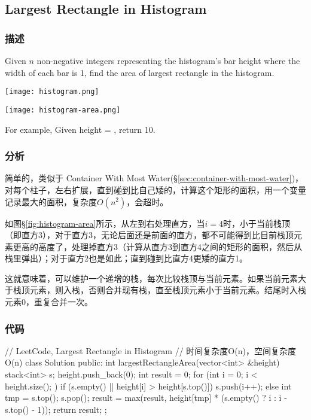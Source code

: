 \subsection{Largest Rectangle in Histogram} %
\label{sec:largest-rectangle-in-histogram}


\subsubsection{描述}
Given $n$ non-negative integers representing the histogram's bar height where the width of each bar is 1, find the area of largest rectangle in the histogram.

\begin{center}
\texttt{[image: histogram.png]}\\
\label{fig:histogram}
\end{center}

\begin{center}
\texttt{[image: histogram-area.png]}\\
\label{fig:histogram-area}
\end{center}

For example,
Given height = \fn{[2,1,5,6,2,3]},
return 10.


\subsubsection{分析}
简单的，类似于 Container With Most Water(\S \ref{sec:container-with-most-water})，对每个柱子，左右扩展，直到碰到比自己矮的，计算这个矩形的面积，用一个变量记录最大的面积，复杂度$O(n^2)$，会超时。

如图\S \ref{fig:histogram-area}所示，从左到右处理直方，当$i=4$时，小于当前栈顶（即直方3），对于直方3，无论后面还是前面的直方，都不可能得到比目前栈顶元素更高的高度了，处理掉直方3（计算从直方3到直方4之间的矩形的面积，然后从栈里弹出）；对于直方2也是如此；直到碰到比直方4更矮的直方1。

这就意味着，可以维护一个递增的栈，每次比较栈顶与当前元素。如果当前元素大于栈顶元素，则入栈，否则合并现有栈，直至栈顶元素小于当前元素。结尾时入栈元素0，重复合并一次。


\subsubsection{代码}
\begin{Code}
// LeetCode, Largest Rectangle in Histogram
// 时间复杂度O(n)，空间复杂度O(n)
class Solution {
public:
    int largestRectangleArea(vector<int> &height) {
        stack<int> s;
        height.push_back(0);
        int result = 0;
        for (int i = 0; i < height.size(); ) {
            if (s.empty() || height[i] > height[s.top()])
                s.push(i++);
            else {
                int tmp = s.top();
                s.pop();
                result = max(result,
                        height[tmp] * (s.empty() ? i : i - s.top() - 1));
            }
        }
        return result;
    }
};
\end{Code}


